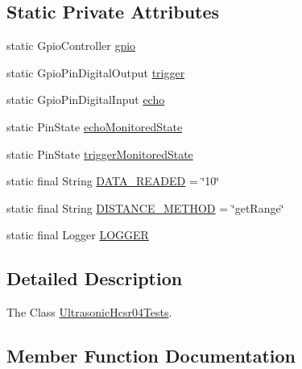 \subsection*{Static Private Attributes}
\begin{DoxyCompactItemize}
\item 
static Gpio\+Controller \hyperlink{classcom_1_1libsensorj_1_1concretesensor_1_1test_1_1UltrasonicHcsr04Tests_adf38a509f718d2c0f6d5b3b46e80b14f}{gpio}
\item 
static Gpio\+Pin\+Digital\+Output \hyperlink{classcom_1_1libsensorj_1_1concretesensor_1_1test_1_1UltrasonicHcsr04Tests_a55b09e3407d26ec3c58fa21959f48c37}{trigger}
\item 
static Gpio\+Pin\+Digital\+Input \hyperlink{classcom_1_1libsensorj_1_1concretesensor_1_1test_1_1UltrasonicHcsr04Tests_a49612a704da180e2bf179ad4cee90f0b}{echo}
\item 
static Pin\+State \hyperlink{classcom_1_1libsensorj_1_1concretesensor_1_1test_1_1UltrasonicHcsr04Tests_ac0a797e07398495efe276cbeb1a38129}{echo\+Monitored\+State}
\item 
static Pin\+State \hyperlink{classcom_1_1libsensorj_1_1concretesensor_1_1test_1_1UltrasonicHcsr04Tests_a51543cdaf2606945a604c3f67aeac74c}{trigger\+Monitored\+State}
\item 
static final String \hyperlink{classcom_1_1libsensorj_1_1concretesensor_1_1test_1_1UltrasonicHcsr04Tests_ad3de6228bd8a3aebd4513449d1955307}{D\+A\+T\+A\+\_\+\+R\+E\+A\+D\+E\+D} = \char`\"{}10\char`\"{}
\item 
static final String \hyperlink{classcom_1_1libsensorj_1_1concretesensor_1_1test_1_1UltrasonicHcsr04Tests_aa58fea25250a46443932bb015e0af28f}{D\+I\+S\+T\+A\+N\+C\+E\+\_\+\+M\+E\+T\+H\+O\+D} = \char`\"{}get\+Range\char`\"{}
\item 
static final Logger \hyperlink{classcom_1_1libsensorj_1_1concretesensor_1_1test_1_1UltrasonicHcsr04Tests_a2ecfecf256b928e26574e87880593489}{L\+O\+G\+G\+E\+R}
\end{DoxyCompactItemize}


\subsection{Detailed Description}
The Class \hyperlink{classcom_1_1libsensorj_1_1concretesensor_1_1test_1_1UltrasonicHcsr04Tests}{Ultrasonic\+Hcsr04\+Tests}. 

\subsection{Member Function Documentation}
\hypertarget{classcom_1_1libsensorj_1_1concretesensor_1_1test_1_1UltrasonicHcsr04Tests_afbf1cd39d83e2df5d01b4cbe546269f6}{}
